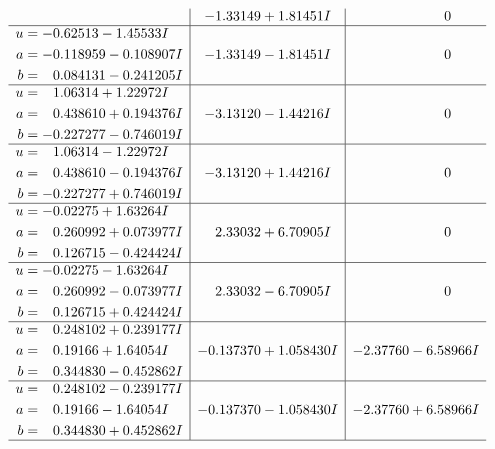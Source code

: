 \documentclass[1p]{elsarticle_modified}
\theoremstyle{definition}
\begin{document}
$$\begin{array}{c|c|c}
 & -1.33149 + 1.81451 I & \phantom{-0.000000 } 0 \\ \hline\begin{aligned}
u &= -0.62513 - 1.45533 I \\
a &= -0.118959 - 0.108907 I \\
b &= \phantom{-}0.084131 - 0.241205 I\end{aligned}
 & -1.33149 - 1.81451 I & \phantom{-0.000000 } 0 \\ \hline\begin{aligned}
u &= \phantom{-}1.06314 + 1.22972 I \\
a &= \phantom{-}0.438610 + 0.194376 I \\
b &= -0.227277 - 0.746019 I\end{aligned}
 & -3.13120 - 1.44216 I & \phantom{-0.000000 } 0 \\ \hline\begin{aligned}
u &= \phantom{-}1.06314 - 1.22972 I \\
a &= \phantom{-}0.438610 - 0.194376 I \\
b &= -0.227277 + 0.746019 I\end{aligned}
 & -3.13120 + 1.44216 I & \phantom{-0.000000 } 0 \\ \hline\begin{aligned}
u &= -0.02275 + 1.63264 I \\
a &= \phantom{-}0.260992 + 0.073977 I \\
b &= \phantom{-}0.126715 - 0.424424 I\end{aligned}
 & \phantom{-}2.33032 + 6.70905 I & \phantom{-0.000000 } 0 \\ \hline\begin{aligned}
u &= -0.02275 - 1.63264 I \\
a &= \phantom{-}0.260992 - 0.073977 I \\
b &= \phantom{-}0.126715 + 0.424424 I\end{aligned}
 & \phantom{-}2.33032 - 6.70905 I & \phantom{-0.000000 } 0 \\ \hline\begin{aligned}
u &= \phantom{-}0.248102 + 0.239177 I \\
a &= \phantom{-}0.19166 + 1.64054 I \\
b &= \phantom{-}0.344830 - 0.452862 I\end{aligned}
 & -0.137370 + 1.058430 I & -2.37760 - 6.58966 I \\ \hline\begin{aligned}
u &= \phantom{-}0.248102 - 0.239177 I \\
a &= \phantom{-}0.19166 - 1.64054 I \\
b &= \phantom{-}0.344830 + 0.452862 I\end{aligned}
 & -0.137370 - 1.058430 I & -2.37760 + 6.58966 I\\
 \hline 
 \end{array}$$\newpage\newpage\renewcommand{\arraystretch}{1}
\end{document}
